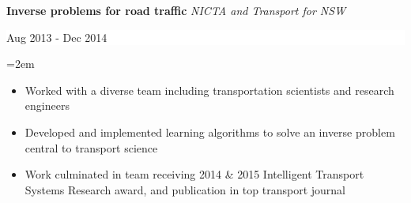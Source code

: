 \documentclass{article}
\newcommand{\EducationEntry}[4]{
    \noindent \textbf{#1}
    \textit{#3}
    \hfill      %
    \colorbox{White}{
      \parbox{9em}{
      \hfill\color{Black}#2}} \par  %
    \noindent\hangindent=2em\hangafter=0 \small #4 %
    \normalsize \par}
\newcommand{\WorkEntry}[4]{       %
    \noindent
    \textbf{#1}
    \textit{#3} %
    \hfill      %
    \colorbox{White}{%
      \parbox{9em}{%
      \hfill\color{Black}#2}} \par   %
    \noindent\hangindent=2em\hangafter=0 \small #4 %
    \normalsize \par}
\begin{document}

\WorkEntry
{Inverse problems for road traffic}
{Aug 2013 - Dec 2014}
{NICTA and Transport for NSW}
{
\begin{itemize} 
    \itemsep-0.1\baselineskip
    \item Worked with a diverse team including transportation scientists and research engineers             
    \item Developed and implemented learning algorithms to solve an inverse problem central to transport science
    \item Work culminated in team receiving 2014 \& 2015 Intelligent Transport Systems Research award, and publication in top transport journal
\end{itemize}
}

\end{document}
